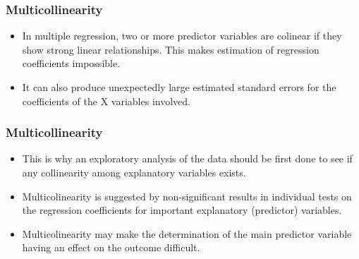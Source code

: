 \documentclass[PredictiveAnalytics101.tex]{subfiles}
\begin{document}
\begin{frame}
\Large
\frametitle{Multicollinearity}
\begin{itemize}
\item In multiple regression, two or more predictor variables are colinear if they show strong linear relationships. This makes estimation of regression coefficients impossible. 
\item It can also produce unexpectedly large estimated standard errors for the coefficients of the X variables involved.

\end{itemize}
\end{frame}
\begin{frame}
\frametitle{Multicollinearity}
\Large
\begin{itemize}
\item This is why an exploratory analysis of the data should be first done to see if any collinearity among explanatory variables exists. 
\item Multicolinearity is suggested by non-significant results in individual tests on the regression coefficients for important explanatory (predictor) variables.
\item Multicolinearity may make the determination of the main predictor variable having an effect on the outcome difficult.
\end{itemize}
\end{frame}
\end{document}
